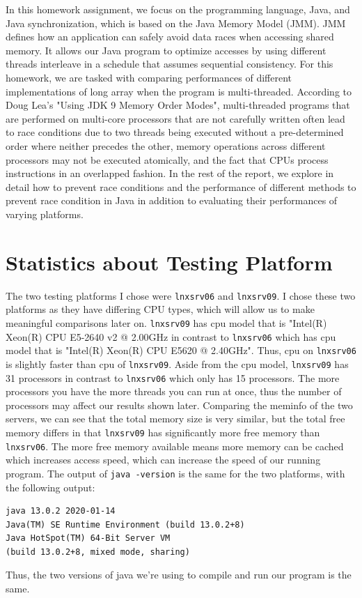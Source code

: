 In this homework assignment, we focus on the programming language, Java, and Java synchronization, which is based on the Java Memory Model (JMM). JMM defines how an application can safely avoid data races when accessing shared memory. It allows our Java program to optimize accesses by using different threads interleave in a schedule that assumes sequential consistency. For this homework, we are tasked with comparing performances of different implementations of long array when the program is multi-threaded. According to Doug Lea's "Using JDK 9 Memory Order Modes", multi-threaded programs that are performed on multi-core processors that are not carefully written often lead to race conditions due to two threads being executed without a pre-determined order where neither precedes the other, memory operations across different processors may not be executed atomically, and the fact that CPUs process instructions in an overlapped fashion. In the rest of the report, we explore in detail how to prevent race conditions and the performance of different methods to prevent race condition in Java in addition to evaluating their performances of varying platforms.


\section{Statistics about Testing Platform}

The two testing platforms I chose were \texttt{lnxsrv06} and \texttt{lnxsrv09}. I chose these two platforms as they have differing CPU types, which will allow us to make meaningful comparisons later on. \texttt{lnxsrv09} has cpu model that is "Intel(R) Xeon(R) CPU E5-2640 v2 @ 2.00GHz in contrast to \texttt{lnxsrv06} which has cpu model that is "Intel(R) Xeon(R) CPU E5620  @ 2.40GHz". Thus, cpu on \texttt{lnxsrv06} is slightly faster than cpu of \texttt{lnxsrv09}. Aside from the cpu model, \texttt{lnxsrv09} has 31 processors in contrast to \texttt{lnxsrv06} which only has 15 processors. The more processors you have the more threads you can run at once, thus the number of processors may affect our results shown later. Comparing the meminfo of the two servers, we can see that the total memory size is very similar, but the total free memory differs in that \texttt{lnxsrv09} has significantly more free memory than \texttt{lnxsrv06}. The more free memory available means more memory can be cached which increases access speed, which can increase the speed of our running program. The output of \texttt{java -version} is the same for the two platforms, with the following output:
\begin{verbatim}
java 13.0.2 2020-01-14
Java(TM) SE Runtime Environment (build 13.0.2+8)
Java HotSpot(TM) 64-Bit Server VM 
(build 13.0.2+8, mixed mode, sharing)
\end{verbatim}
Thus, the two versions of java we're using to compile and run our program is the same.

